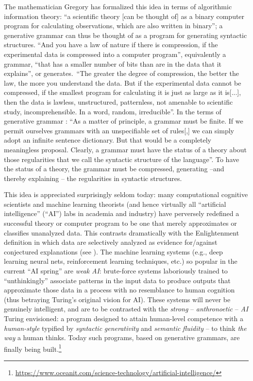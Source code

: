 \documentclass[output=paper]{langsci/langscibook}
\begin{document}
The mathematician Gregory \citet[64]{Chaitin2005} has formalized this idea in
terms of algorithmic information theory: {“a scientific theory [can
be thought of] as a binary computer program for calculating observations, which
are also written in binary”; a generative grammar can thus be thought of as a
program for generating syntactic structures.}{} {“And you have a
law of nature if there is compression, if the experimental data is compressed
into a computer program”, equivalently a grammar, “that has a smaller number of
bits than are in the data that it explains”, or generates.}{~“}{The
greater the degree of compression, the better the law, the more you understand
the data.} {But if the experimental data cannot be compressed, if
the smallest program for calculating it is just as large as it is[...], then
the data is lawless, unstructured, patternless, not amenable to scientific
study, incomprehensible.} {In a word, random, irreducible”. In
the terms of generative grammar \parencite[285]{ChomskyMiller1963}: “As a
matter of principle, a grammar must be finite.}{} {If we permit
ourselves grammars with an unspecifiable set of rules[,] we can simply adopt an
infinite sentence dictionary.} {But that would be a completely
meaningless proposal.} Clearly, a grammar must have the status
of a theory about those regularities that we call the syntactic structure of
the language”. To have the status of a theory, the grammar must be compressed,
generating –and thereby explaining – the regularities in syntactic structures.

This idea is appreciated surprisingly seldom today: many computational
cognitive scientists and machine learning theorists (and hence virtually all
“artificial intelligence” (“AI”) labs in academia and industry) have perversely
redefined a successful theory or computer program to be one that merely
approximates or classifies unanalyzed data. This contrasts dramatically with
the Enlightenment definition in which data are selectively analyzed as evidence
for/against conjectured explanations (see
\citealt{Popper1963,Chomsky2000,Deutsch2011}). The machine learning systems
(e.g., deep learning neural nets, reinforcement learning techniques, etc.) so
popular in the current “AI spring” are \emph{weak} \emph{AI}: brute-force
systems laboriously trained to “unthinkingly” associate patterns in the input
data to produce outputs that approximate those data in a process with no
resemblance to human cognition (thus betraying Turing’s original vision for
AI). These systems will never be genuinely intelligent, and are to be
contrasted with the \emph{strong} – \emph{anthronoetic} – \emph{AI} Turing
envisioned: a program designed to attain human-level competence with a
\emph{human-style} typified by \emph{syntactic} \emph{generativity} and
\emph{semantic} \emph{fluidity} – to think \emph{the} \emph{way} a human
thinks. Today such programs,  based on generative grammars, are finally being
built.\footnote{\url{https://www.oceanit.com/science-technology/artificial-intelligence/}}
\end{document}

